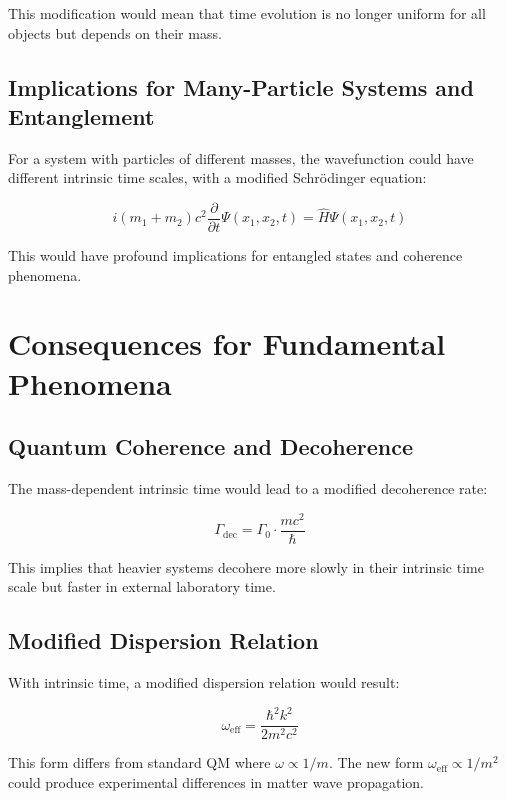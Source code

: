 \documentclass[12pt,a4paper]{article}  %
\begin{document}
	This modification would mean that time evolution is no longer uniform for all objects but depends on their mass.
	
	\subsection{Implications for Many-Particle Systems and Entanglement}
	
	For a system with particles of different masses, the wavefunction could have different intrinsic time scales, with a modified Schrödinger equation:
	
	\begin{equation}
		i (m_1 + m_2) c^2 \frac{\partial}{\partial t} \Psi(x_1, x_2, t) = \hat{H} \Psi(x_1, x_2, t)
	\end{equation}
	
	This would have profound implications for entangled states and coherence phenomena.
	
	\section{Consequences for Fundamental Phenomena}
	
	\subsection{Quantum Coherence and Decoherence}
	
	The mass-dependent intrinsic time would lead to a modified decoherence rate:
	
	\begin{equation}
		\Gamma_{\text{dec}} = \Gamma_0 \cdot \frac{mc^2}{\hbar}
	\end{equation}
	
	This implies that heavier systems decohere more slowly in their intrinsic time scale but faster in external laboratory time.
	
	\subsection{Modified Dispersion Relation}
	
	With intrinsic time, a modified dispersion relation would result:
	
	\begin{equation}
		\omega_{\text{eff}} = \frac{\hbar^2 k^2}{2 m^2 c^2}
	\end{equation}
	
	This form differs from standard QM where $\omega \propto 1/m$. The new form $\omega_{\text{eff}} \propto 1/m^2$ could produce experimental differences in matter wave propagation.
	
\end{document}
